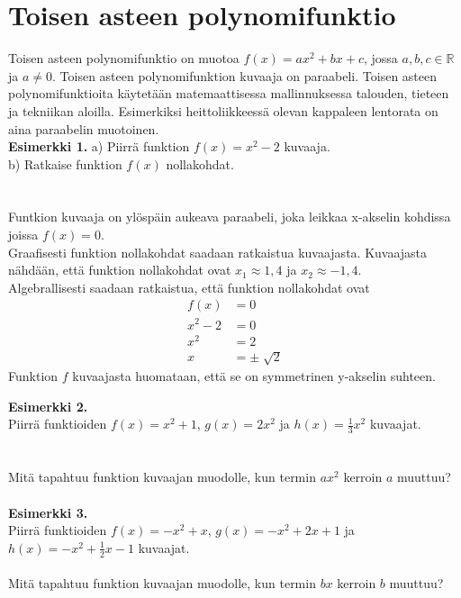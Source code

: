 \chapter{Toisen asteen polynomifunktio}
Toisen asteen polynomifunktio on muotoa $f(x)=ax^2+bx+c$, jossa $a,b,c \in \mathbb{R}$ ja $a \neq 0$. Toisen asteen polynomifunktion kuvaaja on paraabeli. Toisen asteen polynomifunktioita käytetään matemaattisessa mallinnuksessa talouden, tieteen ja tekniikan aloilla. Esimerkiksi heittoliikkeessä olevan kappaleen lentorata on aina paraabelin muotoinen. \\
\textbf{Esimerkki 1.}
a) Piirrä funktion $f(x)=x^2-2$ kuvaaja. \\ 
b) Ratkaise funktion $f(x)$ nollakohdat. \\ \\
\missingfigure \\
Funtkion kuvaaja on ylöspäin aukeava paraabeli, joka leikkaa x-akselin kohdissa joissa $f(x)=0$. \\
Graafisesti funktion nollakohdat saadaan ratkaistua kuvaajasta. Kuvaajasta nähdään, että funktion nollakohdat ovat $x_1 \approx 1,4$ ja $x_2 \approx -1,4$. \\
Algebrallisesti saadaan ratkaistua, että funktion nollakohdat ovat 
\begin{align*}
f(x)&=0 \\
x^2-2&=0 \\
x^2&=2 \\
x&= \pm \sqrt[]{2}
\end{align*}
Funktion $f$ kuvaajasta huomataan, että se on symmetrinen y-akselin suhteen. 

\textbf{Esimerkki 2.} \\
Piirrä funktioiden $f(x)=x^2+1$, $g(x)=2x^2$ ja $h(x)=\frac{1}{3}x^2$ kuvaajat. \\ \\
\missingfigure \\
Mitä tapahtuu funktion kuvaajan muodolle, kun termin $ax^2$ kerroin $a$ muuttuu? \\ \\

\textbf{Esimerkki 3.} \\
Piirrä funktioiden $f(x)=-x^2+x$, $g(x)=-x^2+2x+1$ ja $h(x)=-x^2+\frac{1}{2}x-1$ kuvaajat. \\
\missingfigure \\
Mitä tapahtuu funktion kuvaajan muodolle, kun termin $bx$ kerroin $b$ muuttuu? \\ \\

